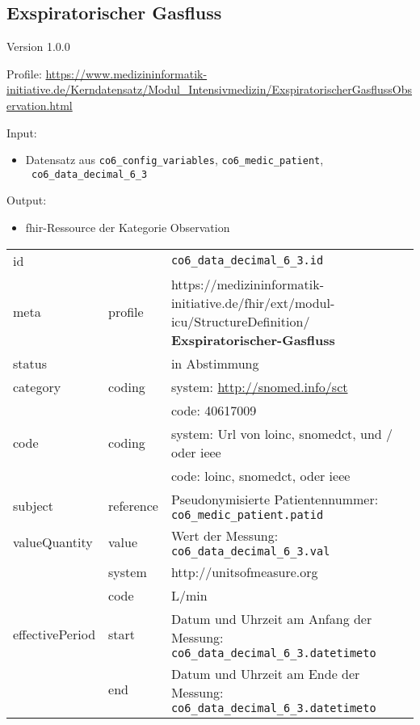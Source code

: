 \subsection{
Exspiratorischer Gasfluss} 
\noindent Version 1.0.0

\noindent Profile: \url{https://www.medizininformatik-initiative.de/Kerndatensatz/Modul_Intensivmedizin/ExspiratorischerGasflussObservation.html}

\noindent Input:
\begin{itemize}
	\item Datensatz aus \texttt{co6\_config\_variables}, \texttt{co6\_medic\_patient}, \\ \texttt{
co6\_data\_decimal\_6\_3}
\end{itemize}
Output:
\begin{itemize}
        \item \ac{fhir}-Ressource der Kategorie \glqq Observation\grqq{}
\end{itemize}
\begin{longtable}{|l|l|p{7.5cm}|}
        \hline
        \rowcolor{lightgray} \multicolumn{3}{|l|}{Data Mapping (inhaltlich)} \\ \hline
        id &  & \texttt{co6\_data\_decimal\_6\_3.id} \\ \hline
	meta & profile & https://medizininformatik-initiative.de/fhir/ext/modul-icu/StructureDefinition/\textbf{
Exspiratorischer-Gasfluss} \\ \hline 
	status &  & in Abstimmung  \\ \hline 
	category & coding & system: \url{http://snomed.info/sct} \\
\cline{3-3}
	& & code: 40617009 \\ \hline
	code & coding & system: Url von \ac{loinc}, \ac{snomedct}, und / oder \ac{ieee} \\ 
	\cline{3-3} 
	 &  & code: \ac{loinc}, \ac{snomedct}, oder \ac{ieee} \\ \hline
	subject & reference & Pseudonymisierte Patientennummer: \texttt{co6\_medic\_patient.patid} \\ \hline
	valueQuantity & value & Wert der Messung: \texttt{
co6\_data\_decimal\_6\_3.val} \\
        \cline{2-3}
         & system & http://unitsofmeasure.org \\
         \cline{2-3}
         & code & L/min \\ \hline
    effectivePeriod & start & Datum und Uhrzeit am Anfang der Messung: \texttt{
co6\_data\_decimal\_6\_3.datetimeto} \\
    \cline{2-3}
     & end & Datum und Uhrzeit am Ende der Messung: \texttt{
co6\_data\_decimal\_6\_3.datetimeto} \\ \hline
\end{longtable}


